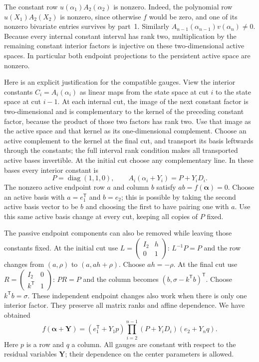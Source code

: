 The constant row $u(\alpha_1)A_2(\alpha_2)$ is nonzero. Indeed,
the polynomial row $u(X_1)A_2(X_2)$ is nonzero, since otherwise
$f$ would be zero, and one of its nonzero bivariate entries
survives by part~1. Similarly
$A_{n-1}(\alpha_{n-1})v(\alpha_n)\ne0$. Because every internal
constant interval has rank two, multiplication by the remaining
constant interior factors is injective on these two-dimensional
active spaces. In particular both endpoint projections to the
persistent active space are nonzero.

Here is an explicit justification for the compatible gauges.
View the interior constants $C_i=A_i(\alpha_i)$ as linear maps
from the state space at cut $i$ to the state space at cut $i-1$.
At each internal cut, the image of the next constant factor is
two-dimensional and is complementary to the kernel of the
preceding constant factor, because the product of those two
factors has rank two. Use that image as the active space and
that kernel as its one-dimensional complement. Choose an
active complement to the kernel at the final cut, and transport
its basis leftwards through the constants; the full interval
rank condition makes all transported active bases invertible.
At the initial cut choose any complementary line. In these
bases every interior constant is
\[
 P=\operatorname{diag}(1,1,0),\qquad
 A_i(\alpha_i+Y_i)=P+Y_iD_i.
 \tag{I.95}
\]
The nonzero active endpoint row $a$ and column $b$ satisfy
$ab=f(\boldsymbol\alpha)=0$. Choose an active basis with
$a=e_1^{\mathsf T}$ and $b=e_2$; this is possible by taking
the second active basis vector to be $b$ and choosing the first
to have pairing one with $a$. Use this same active basis change
at every cut, keeping all copies of $P$ fixed.

The passive endpoint components can also be removed while
leaving those constants fixed. At the initial cut use
$L=\left(\begin{smallmatrix}I_2&h\\0&1\end{smallmatrix}\right)$:
$L^{-1}P=P$ and the row changes from $(a,\rho)$ to
$(a,ah+\rho)$. Choose $ah=-\rho$. At the final cut use
$R=\left(\begin{smallmatrix}I_2&0\\k^{\mathsf T}&1\end{smallmatrix}\right)$:
$PR=P$ and the column becomes
$(b,\sigma-k^{\mathsf T}b)^{\mathsf T}$. Choose
$k^{\mathsf T}b=\sigma$. These independent endpoint changes
also work when there is only one interior factor. They preserve
all matrix ranks and affine dependence. We have obtained
\[
 f(\boldsymbol\alpha+\mathbf Y)
 =(e_1^{\mathsf T}+Y_1p)
   \prod_{i=2}^{n-1}(P+Y_iD_i)
   (e_2+Y_nq).
 \tag{I.96}
\]
Here $p$ is a row and $q$ a column. All gauges are constant with
respect to the residual variables $\mathbf Y$; their dependence
on the center parameters is allowed.


